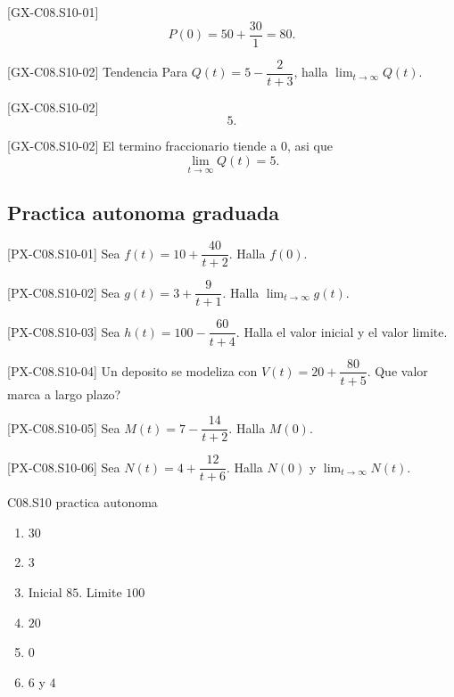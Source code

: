 \begin{fullsolution}{[GX-C08.S10-01]}
\[
P(0)=50+\frac{30}{1}=80.
\]
\end{fullsolution}

\begin{guidedexercise}{[GX-C08.S10-02] Tendencia}
Para \(Q(t)=5-\dfrac{2}{t+3}\), halla \(\lim_{t\to\infty}Q(t)\).
\end{guidedexercise}

\begin{shortanswer}{[GX-C08.S10-02]}
\[
5.
\]
\end{shortanswer}

\begin{fullsolution}{[GX-C08.S10-02]}
El termino fraccionario tiende a \(0\), asi que
\[
\lim_{t\to\infty}Q(t)=5.
\]
\end{fullsolution}

\subsection*{Practica autonoma graduada}
\begin{exercise}{[PX-C08.S10-01] Sea \(f(t)=10+\dfrac{40}{t+2}\). Halla \(f(0)\).}
\end{exercise}
\begin{exercise}{[PX-C08.S10-02] Sea \(g(t)=3+\dfrac{9}{t+1}\). Halla \(\lim_{t\to\infty}g(t)\).}
\end{exercise}
\begin{exercise}{[PX-C08.S10-03] Sea \(h(t)=100-\dfrac{60}{t+4}\). Halla el valor inicial y el valor limite.}
\end{exercise}
\begin{exercise}{[PX-C08.S10-04] Un deposito se modeliza con \(V(t)=20+\dfrac{80}{t+5}\). Que valor marca a largo plazo?}
\end{exercise}
\begin{exercise}{[PX-C08.S10-05] Sea \(M(t)=7-\dfrac{14}{t+2}\). Halla \(M(0)\).}
\end{exercise}
\begin{exercise}{[PX-C08.S10-06] Sea \(N(t)=4+\dfrac{12}{t+6}\). Halla \(N(0)\) y \(\lim_{t\to\infty}N(t)\).}
\end{exercise}

\begin{shortanswer}{C08.S10 practica autonoma}
\begin{enumerate}[label=\textbf{PX-C08.S10-\arabic*:}, leftmargin=*]
  \item \(30\)
  \item \(3\)
  \item Inicial \(85\). Limite \(100\)
  \item \(20\)
  \item \(0\)
  \item \(6\) y \(4\)
\end{enumerate}
\end{shortanswer}

